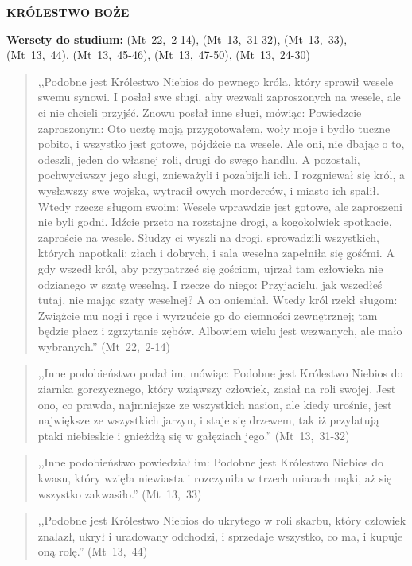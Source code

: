 \documentclass[10pt,a4paper,oneside]{article}
\begin{document}
\centerline{\textbf{\MakeUppercase{Królestwo Boże}}}
\begin{center}
\textbf{Wersety do studium:} (Mt~22,~2-14), (Mt~13,~31-32), (Mt~13,~33), (Mt~13,~44), (Mt~13,~45-46), (Mt~13,~47-50), (Mt~13,~24-30)
\end{center}
\begin{quote}
,,Podobne jest Królestwo Niebios do pewnego króla, który sprawił wesele swemu synowi. I posłał swe sługi, aby wezwali zaproszonych na wesele, ale ci nie chcieli przyjść. Znowu posłał inne sługi, mówiąc: Powiedzcie zaproszonym: Oto ucztę moją przygotowałem, woły moje i bydło tuczne pobito, i wszystko jest gotowe, pójdźcie na wesele. Ale oni, nie dbając o to, odeszli, jeden do własnej roli, drugi do swego handlu. A pozostali, pochwyciwszy jego sługi, znieważyli i pozabijali ich. I rozgniewał się król, a wysławszy swe wojska, wytracił owych morderców, i miasto ich spalił. Wtedy rzecze sługom swoim: Wesele wprawdzie jest gotowe, ale zaproszeni nie byli godni. Idźcie przeto na rozstajne drogi, a kogokolwiek spotkacie, zaproście na wesele. Słudzy ci wyszli na drogi, sprowadzili wszystkich, których napotkali: złach i dobrych, i sala weselna zapełniła się gośćmi. A gdy wszedł król, aby przypatrzeć się gościom, ujrzał tam człowieka nie odzianego w szatę weselną. I rzecze do niego: Przyjacielu, jak wszedłeś tutaj, nie mając szaty weselnej? A on oniemiał. Wtedy król rzekł sługom: Zwiążcie mu nogi i ręce i wyrzućcie go do ciemności zewnętrznej; tam będzie płacz i zgrzytanie zębów. Albowiem wielu jest wezwanych, ale mało wybranych.'' (Mt~22,~2-14)
\end{quote}
\begin{quote}
,,Inne podobieństwo podał im, mówiąc: Podobne jest Królestwo Niebios do ziarnka gorczycznego, który wziąwszy człowiek, zasiał na roli swojej. Jest ono, co prawda, najmniejsze ze wszystkich nasion, ale kiedy urośnie, jest największe ze wszystkich jarzyn, i staje się drzewem, tak iż przylatują ptaki niebieskie i gnieżdżą się w gałęziach jego.'' (Mt~13,~31-32)
\end{quote}
\begin{quote}
,,Inne podobieństwo powiedział im: Podobne jest Królestwo Niebios do kwasu, który wzięła niewiasta i rozczyniła w trzech miarach mąki, aż się wszystko zakwasiło.'' (Mt~13,~33)
\end{quote}
\begin{quote}
,,Podobne jest Królestwo Niebios do ukrytego w roli skarbu, który człowiek znalazł, ukrył i uradowany odchodzi, i sprzedaje wszystko, co ma, i kupuje oną rolę.'' (Mt~13,~44)
\end{quote}
\end{document}
